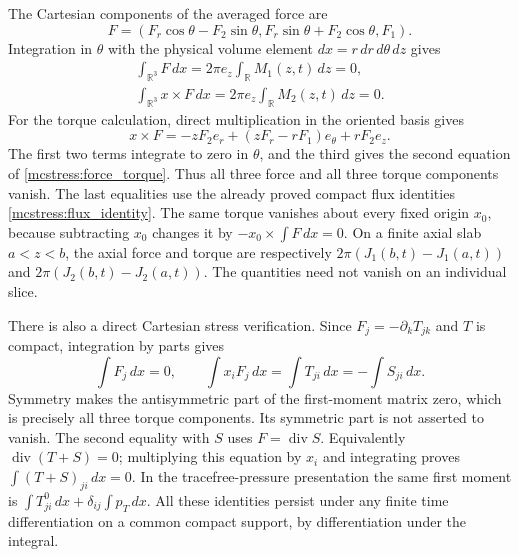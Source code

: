 \documentclass[11pt]{article}
\begin{document}
The Cartesian components of the averaged force are
\[
 F=(F_r\cos\theta-F_2\sin\theta,
       F_r\sin\theta+F_2\cos\theta,F_1).
\]
Integration in $\theta$ with the physical volume element
$dx=r\,dr\,d\theta\,dz$ gives
\begin{equation}\label{mcstress:force_torque}
\begin{gathered}
 \int_{\mathbb R^3}F\,dx
  =2\pi e_z\int_{\mathbb R}M_1(z,t)\,dz=0,\\
 \int_{\mathbb R^3}x\times F\,dx
  =2\pi e_z\int_{\mathbb R}M_2(z,t)\,dz=0.
\end{gathered}
\end{equation}
For the torque calculation, direct multiplication in the oriented
basis gives
\[
 x\times F=-zF_2e_r+(zF_r-rF_1)e_\theta+rF_2e_z.
\]
The first two terms integrate to zero in $\theta$, and the third
gives the second equation of \eqref{mcstress:force_torque}.
Thus all three force and all three torque components vanish. The last
equalities use the already proved compact flux identities
\eqref{mcstress:flux_identity}. The same torque vanishes about every
fixed origin $x_0$, because subtracting $x_0$ changes it by
$-x_0\times\int F\,dx=0$. On a finite axial slab $a<z<b$, the
axial force and torque are respectively
$2\pi(J_1(b,t)-J_1(a,t))$ and
$2\pi(J_2(b,t)-J_2(a,t))$. The quantities need not vanish on an
individual slice.

There is also a direct Cartesian stress verification. Since
$F_j=-\partial_kT_{jk}$ and $T$ is compact, integration by parts gives
\begin{equation}\label{mcstress:first_moments}
 \int F_j\,dx=0,\qquad
 \int x_iF_j\,dx=\int T_{ji}\,dx=-\int S_{ji}\,dx.
\end{equation}
Symmetry makes the antisymmetric part of the first-moment matrix zero,
which is precisely all three torque components. Its symmetric part
is not asserted to vanish. The second equality with $S$ uses
$F=\operatorname{div}S$. Equivalently
$\operatorname{div}(T+S)=0$; multiplying this equation by $x_i$ and
integrating proves $\int(T+S)_{ji}\,dx=0$. In the tracefree-pressure
presentation the same first moment is
$\int T^0_{ji}\,dx+\delta_{ij}\int p_T\,dx$.
All these identities persist under any finite time differentiation on
a common compact support, by differentiation under the integral.
\end{document}
